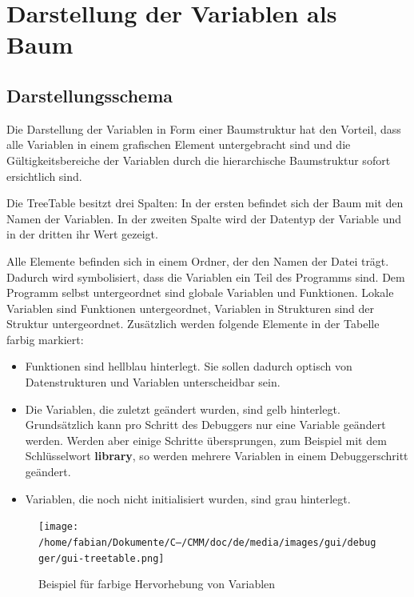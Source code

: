 \section{Darstellung der Variablen als Baum}
\label{treetable}

\subsection{Darstellungsschema}

Die Darstellung der Variablen in Form einer Baumstruktur hat den Vorteil, dass alle Variablen in einem grafischen Element untergebracht sind und die Gültigkeitsbereiche der Variablen durch die hierarchische Baumstruktur sofort ersichtlich sind.

Die TreeTable besitzt drei Spalten: In der ersten befindet sich der Baum mit den Namen der Variablen. In der zweiten Spalte wird der Datentyp der Variable und in der dritten ihr Wert gezeigt.

Alle Elemente befinden sich in einem Ordner, der den Namen der Datei trägt. Dadurch wird symbolisiert, dass die Variablen ein Teil des Programms sind. Dem Programm selbst untergeordnet sind globale Variablen und Funktionen. Lokale Variablen sind Funktionen untergeordnet, Variablen in Strukturen sind der Struktur untergeordnet.
Zusätzlich werden folgende Elemente in der Tabelle farbig markiert:
\begin{itemize}
\item Funktionen sind hellblau hinterlegt. Sie sollen dadurch optisch von Datenstrukturen und Variablen unterscheidbar sein.
\item Die Variablen, die zuletzt geändert wurden, sind gelb hinterlegt. Grundsätzlich kann pro Schritt des Debuggers nur eine Variable geändert werden. Werden aber einige Schritte übersprungen, zum Beispiel mit dem Schlüsselwort \textbf{library}, so werden mehrere Variablen in einem Debuggerschritt geändert.
\item Variablen, die noch nicht initialisiert wurden, sind grau hinterlegt.
\end{itemize}

\begin{figure}[htp]
\centering
\texttt{[image: /home/fabian/Dokumente/C--/CMM/doc/de/media/images/gui/debugger/gui-treetable.png]}
\caption{Beispiel für farbige Hervorhebung von Variablen}
\label{fig:deb-tt-example}
\end{figure}

